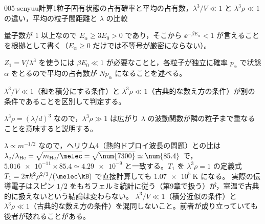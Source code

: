 \documentclass[uplatex,dvipdfmx,a4paper,11pt]{jsarticle}
\begin{document}
\begin{mondai}{005-senyuu}{計算}{1粒子固有状態の占有確率と平均の占有数，$\lambda^{3}/V\ll1$ と $\lambda^{3}\rho\ll1$ の違い，平均の粒子間距離と $\lambda$ の比較}
\begin{tadashii}
\begin{ronten}
  \item {} 量子数が $1$ 以上なので $E_\alpha\ge3E_0>0$ であり，そこから $\ee^{-\beta E_\alpha}<1$ が言えることを根拠として書く（$E_\alpha\ge0$ だけでは不等号が厳密にならない）。
  \item {} $Z_1=V/\lambda^{3}$ を使うには $\beta E_0\ll1$ が必要なことと，各粒子が独立に確率 $p_\alpha$ で状態 $\alpha$ をとるので平均の占有数が $Np_\alpha$ になることを述べる。
  \item {} $\lambda^{3}/V\ll1$（和を積分にする条件）と $\lambda^{3}\rho\ll1$（古典的な数え方の条件）が別の条件であることを区別して判定する。
  \item {} $\lambda^{3}\rho=(\lambda/d)^{3}$ なので，$\lambda^{3}\rho\gg1$ は広がり $\lambda$ の波動関数が隣の粒子まで重なることを意味すると説明する。
\end{ronten}
\kenzan $\lambda\propto m^{-1/2}$ なので，ヘリウム4（熱的ドブロイ波長の問題）との比は $\lambda_{\mathrm{e}}/\lambda_{\mathrm{He}}=\sqrt{m_{\mathrm{He}}/\melec}=\sqrt{\num{7300}}\simeq\num{85.4}$ で，$\num{5.016e-11}\times\num{85.4}\simeq\num{4.29e-9}$ と一致する。$T_1$ を $\lambda^{3}\rho=1$ の定義式 $T_1=2\pi\hbar^{2}\rho^{2/3}/(\melec\kB)$ で直接計算しても $\qty{1.07e5}{\kelvin}$ になる。 実際の伝導電子はスピン $1/2$ をもちフェルミ統計に従う（第9章で扱う）が，室温で古典的に扱えないという結論は変わらない。
\tsumazuki $\lambda^{3}/V\ll1$（積分近似の条件）と $\lambda^{3}\rho\ll1$（古典的な数え方の条件）を混同しないこと。前者が成り立っていても後者が破れることがある。
\end{tadashii}
\end{mondai}

\noteowari
\end{document}
